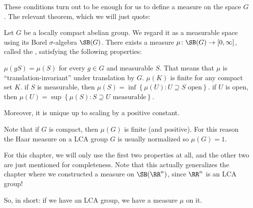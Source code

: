 These conditions turn out to be enough
for us to define a measure on the space $G$.
The relevant theorem, which we will just quote:
\begin{theorem}
	Let $G$ be a locally compact abelian group.
	We regard it as a measurable space
	using its Borel $\sigma$-algebra $\SB(G)$.
	There exists a measure $\mu \colon \SB(G) \to [0,\infty]$,
	called the ,
	satisfying the following properties:
	\begin{itemize}
		\ii $\mu(gS) = \mu(S)$ for every $g \in G$ and measurable $S$.
		That means that $\mu$ is ``translation-invariant''
		under translation by $G$.
		\ii $\mu(K)$ is finite for any compact set $K$.
		\ii if $S$ is measurable, then $\mu(S) = \inf\left\{ \mu(U) \colon U \supseteq S \text{ open} \right\}$.
		\ii if $U$ is open, then $\mu(U) = \sup\left\{ \mu(S) \colon S \supseteq U \text{ measurable} \right\}$.
	\end{itemize}
	Moreover, it is unique up to scaling by a positive constant.
\end{theorem}

\begin{remark}
	Note that if $G$ is compact, then $\mu(G)$ is finite (and positive).
	For this reason the Haar measure on a LCA group $G$
	is usually normalized so $\mu(G) = 1$.
\end{remark}

For this chapter, we will only use the first two properties at all,
and the other two are just mentioned for completeness.
Note that this actually generalizes the chapter where
we constructed a measure on $\SB(\RR^n)$,
since $\RR^n$ is an LCA group!

So, in short: if we have an LCA group,
we have a measure $\mu$ on it.

